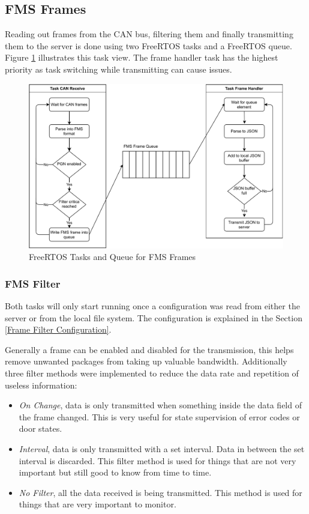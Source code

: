 \newpage
\subsection{FMS Frames} \label{FMS Frame Handler}
Reading out frames from the CAN bus, filtering them and finally transmitting them to the server is done using two FreeRTOS tasks and a FreeRTOS queue. Figure \ref{fig:fms-software} illustrates this task view. The frame handler task has the highest priority as task switching while transmitting can cause issues.
\begin{figure}[h!]
	\centering
	\includegraphics[width=\textwidth]{images/fms-software}
	\caption{FreeRTOS Tasks and Queue for FMS Frames}
	\label{fig:fms-software}
\end{figure}

\subsubsection{FMS Filter}
Both tasks will only start running once a configuration was read from either the server or from the local file system. The configuration is explained in the Section \ref{Frame Filter Configuration}.

Generally a frame can be enabled and disabled for the transmission, this helps remove unwanted packages from taking up valuable bandwidth. Additionally three filter methods were implemented to reduce the data rate and repetition of useless information:
\begin{itemize}
		\item \textit{On Change}, data is only transmitted when something inside the data field of the frame changed. This is very useful for state supervision of error codes or door states. 
		\item \textit{Interval}, data is only transmitted with a set interval. Data in between the set interval is discarded. This filter method is used for things that are not very important but still good to know from time to time.
		\item \textit{No Filter}, all the data received is being transmitted. This method is used for things that are very important to monitor.
\end{itemize}

